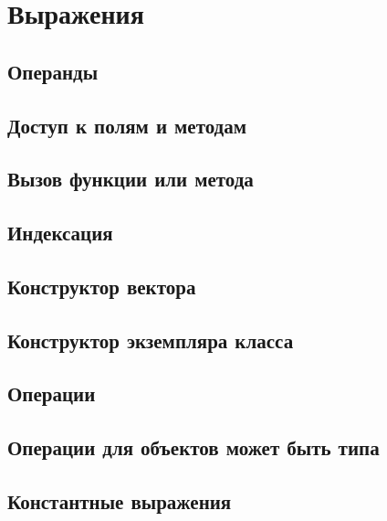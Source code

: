 \hypertarget{expressions}{%
\section{Выражения}\label{expr:chapter}}

\hypertarget{operands}{%
\subsection{Операнды}\label{expr:operands}}

\hypertarget{selector}{%
\subsection{Доступ к полям и методам}\label{expr:selector}}

\hypertarget{call}{%
\subsection{Вызов функции или метода}\label{expr:call}}


\hypertarget{indexation}{%
\subsection{Индексация}\label{expr:indexation}}


\hypertarget{vector-composite}{%
\subsection{Конструктор вектора}\label{expr:vector-composite}}

\hypertarget{class-composite}{%
\subsection{Конструктор экземпляра класса}\label{expr:class-composite}}


\hypertarget{operators}{%
\subsection{Операции}\label{expr:operators}}

\hypertarget{mb-ops}{%
\subsection{Операции для объектов может быть типа}\label{expr:mb-ops}}


\hypertarget{const-expr}{%
\subsection{Константные выражения}\label{expr:const-expr}}